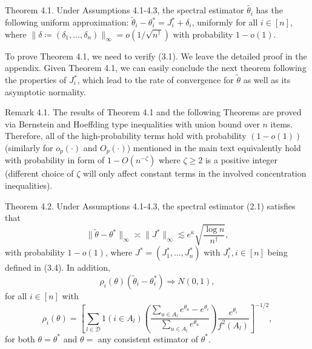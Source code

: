 Theorem 4.1. Under Assumptions 4.1-4.3, the spectral estimator \(\widetilde{\theta_{i}}\) has the following uniform approximation: \(\widetilde{\theta}_{i} - \theta_{i}^{*} = J_{i}^{*} + \delta_{i}\), uniformly for all \(i\in [n]\), where \(\| \delta \coloneqq (\delta_{1},\dots ,\delta_{n})\|_{\infty} = o(1 / \sqrt{n^{\dagger}})\) with probability \(1 - o(1)\).

To prove Theorem 4.1, we need to verify (3.1). We leave the detailed proof in the appendix. Given Theorem 4.1, we can easily conclude the next theorem following the properties of \(J_{i}^{*}\), which lead to the rate of convergence for \(\widetilde{\theta}\) as well as its asymptotic normality.

Remark 4.1. The results of Theorem 4.1 and the following Theorems are proved via Bernstein and Hoeffding type inequalities with union bound over \(n\) items. Therefore, all of the high-probability terms hold with probability \((1 - o(1))\) (similarly for \(o_{p}(\cdot)\) and \(O_{p}(\cdot)\)) mentioned in the main text equivalently hold with probability in form of \(1 - O(n^{- \zeta})\) where \(\zeta \geq 2\) is a positive integer (different choice of \(\zeta\) will only affect constant terms in the involved concentration inequalities).

Theorem 4.2. Under Assumptions 4.1-4.3, the spectral estimator (2.1) satisfies that
\[
\| \widetilde{\theta} -\theta^{*}\|_{\infty}\asymp \| J^{*}\|_{\infty}\lesssim e^{\bar{\kappa}}\sqrt{\frac{\log n}{n^{\dagger}}}, \tag{4.3}
\]
with probability \(1 - o(1)\), where \(J^{*} = (J_{1}^{*},\dots ,J_{n}^{*})\) with \(J_{i}^{*},i\in [n]\) being defined in (3.4). In addition,
\[
\rho_{i}(\theta)(\widetilde{\theta}_{i} - \theta_{i}^{*})\Rightarrow N(0,1),
\]
for all \(i\in [n]\) with
\[
\rho_{i}(\theta) = \left[\sum_{l\in \mathcal{D}}1(i\in A_{l})\left(\frac{\sum_{u\in A_{l}}e^{\theta_{u}} - e^{\theta_{i}}}{\sum_{u\in A_{l}}e^{\theta_{u}}}\right)\frac{e^{\theta_{i}}}{f^{2}(A_{l})}\right]^{-1/2},
\]
for both \(\theta = \theta^{*}\) and \(\theta =\) any consistent estimator of \(\theta^{*}\).

